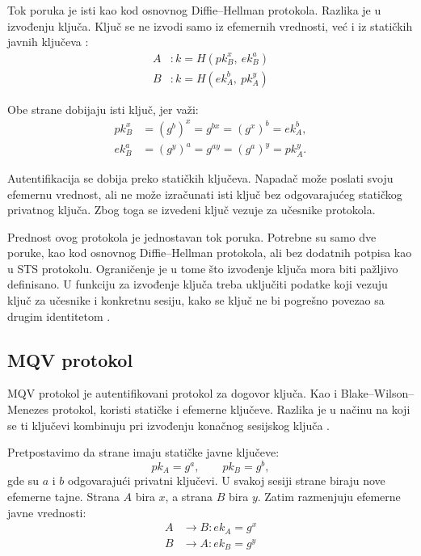 Tok poruka je isti kao kod osnovnog Diffie--Hellman protokola. Razlika je u izvođenju ključa. Ključ se ne izvodi samo iz efemernih vrednosti, već i iz statičkih javnih ključeva \cite{smart2016cryptography}:
\[
\begin{aligned}
A &: k = H(pk_B^x,\ ek_B^a) \\
B &: k = H(ek_A^b,\ pk_A^y)
\end{aligned}
\]

Obe strane dobijaju isti ključ, jer važi:
\[
\begin{aligned}
pk_B^x &= (g^b)^x = g^{bx} = (g^x)^b = ek_A^b, \\
ek_B^a &= (g^y)^a = g^{ay} = (g^a)^y = pk_A^y.
\end{aligned}
\]


Autentifikacija se dobija preko statičkih ključeva. Napadač može poslati svoju efemernu vrednost, ali ne može izračunati isti ključ bez odgovarajućeg statičkog privatnog ključa. Zbog toga se izvedeni ključ vezuje za učesnike protokola.

Prednost ovog protokola je jednostavan tok poruka. Potrebne su samo dve poruke, kao kod osnovnog Diffie--Hellman protokola, ali bez dodatnih potpisa kao u STS protokolu. Ograničenje je u tome što izvođenje ključa mora biti pažljivo definisano. U funkciju za izvođenje ključa treba uključiti podatke koji vezuju ključ za učesnike i konkretnu sesiju, kako se ključ ne bi pogrešno povezao sa drugim identitetom \cite{smart2016cryptography}.

\subsection{MQV protokol}

MQV protokol je autentifikovani protokol za dogovor ključa. Kao i Blake--Wilson--Menezes protokol, koristi statičke i efemerne ključeve. Razlika je u načinu na koji se ti ključevi kombinuju pri izvođenju konačnog sesijskog ključa \cite{smart2016cryptography}.

Pretpostavimo da strane imaju statičke javne ključeve:
\[
pk_A = g^a, \qquad pk_B = g^b,
\]
gde su \(a\) i \(b\) odgovarajući privatni ključevi. U svakoj sesiji strane biraju nove efemerne tajne. Strana \(A\) bira \(x\), a strana \(B\) bira \(y\). Zatim razmenjuju efemerne javne vrednosti:
\[
\begin{aligned}
A &\rightarrow B : ek_A = g^x \\
B &\rightarrow A : ek_B = g^y
\end{aligned}
\]

